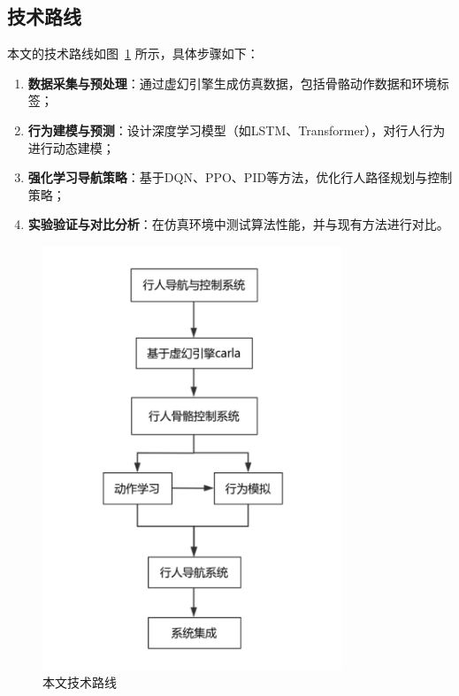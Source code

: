 \subsection{技术路线}

本文的技术路线如图~\ref{fig:tech_route} 所示，具体步骤如下：

\begin{enumerate}
    \item \textbf{数据采集与预处理}：通过虚幻引擎生成仿真数据，包括骨骼动作数据和环境标签；
    \item \textbf{行为建模与预测}：设计深度学习模型（如LSTM、Transformer），对行人行为进行动态建模；
    \item \textbf{强化学习导航策略}：基于DQN、PPO、PID等方法，优化行人路径规划与控制策略；
    \item \textbf{实验验证与对比分析}：在仿真环境中测试算法性能，并与现有方法进行对比。
\end{enumerate}

\begin{figure}[htbp]
    \centering
    \includegraphics[width=0.8\textwidth]{images/tech_route.pdf}
    \caption{本文技术路线}
    \label{fig:tech_route}
\end{figure}
